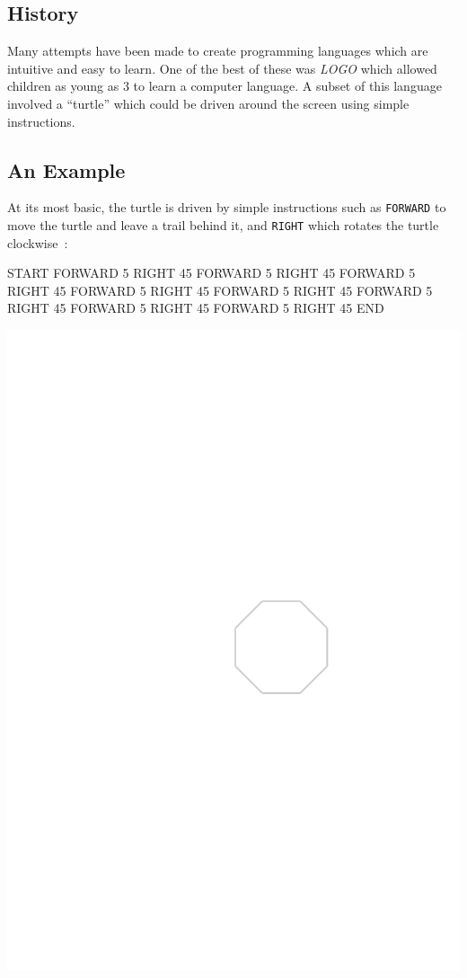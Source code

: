 
\subsection*{History}
Many attempts have been made to create programming languages
which are intuitive and easy to learn.
One of the best of these was {\it LOGO} which allowed
children as young as 3 to learn a computer language.
A subset of this language involved a ``turtle'' which
could be driven around the screen using simple instructions.

\subsection*{An Example}
At its most basic, the turtle is driven by simple instructions 
such as \verb^FORWARD^ to move the turtle and leave a trail behind it,
and \verb^RIGHT^ which rotates the turtle clockwise~:
\begin{codesnippet}
START
  FORWARD 5
  RIGHT 45
  FORWARD 5
  RIGHT 45
  FORWARD 5
  RIGHT 45
  FORWARD 5
  RIGHT 45
  FORWARD 5
  RIGHT 45
  FORWARD 5
  RIGHT 45
  FORWARD 5
  RIGHT 45
  FORWARD 5
  RIGHT 45
END
\end{codesnippet}
\begin{center}
\includegraphics[clip,trim=10cm 11cm 5cm 11cm,scale=1.25]{../Pictures/out_octagon1.pdf}
\end{center}

